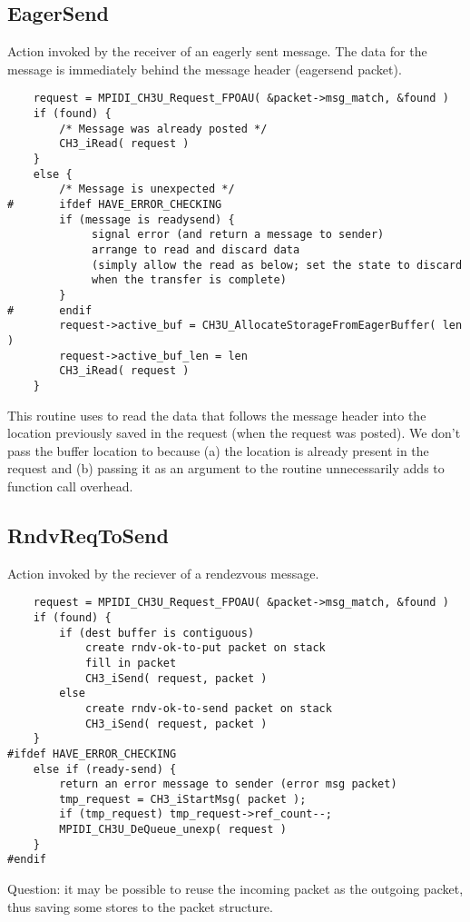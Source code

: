 \documentclass{article}
\begin{document}
\subsection{EagerSend}
Action invoked by the receiver of an eagerly sent message.  The data for the
message is immediately behind the message header (eagersend packet).
\begin{verbatim}
    request = MPIDI_CH3U_Request_FPOAU( &packet->msg_match, &found )
    if (found) {
        /* Message was already posted */
        CH3_iRead( request )
    }
    else {
        /* Message is unexpected */
#       ifdef HAVE_ERROR_CHECKING
        if (message is readysend) {
             signal error (and return a message to sender)
             arrange to read and discard data 
             (simply allow the read as below; set the state to discard
             when the transfer is complete)
        }
#       endif
        request->active_buf = CH3U_AllocateStorageFromEagerBuffer( len )
        request->active_buf_len = len
        CH3_iRead( request )
    }
\end{verbatim}
This routine uses  to read the data that follows the
message header into the location previously saved in the request (when
the request was posted).  We don't pass the buffer location to
 because (a) the location is already present in the
request and (b) passing it as an argument to the routine unnecessarily
adds to function call overhead.
\subsection{RndvReqToSend}
Action invoked by the reciever of a rendezvous message.
\begin{verbatim}
    request = MPIDI_CH3U_Request_FPOAU( &packet->msg_match, &found )
    if (found) {
        if (dest buffer is contiguous)
            create rndv-ok-to-put packet on stack
            fill in packet
            CH3_iSend( request, packet )
        else
            create rndv-ok-to-send packet on stack
            CH3_iSend( request, packet )
    }
#ifdef HAVE_ERROR_CHECKING
    else if (ready-send) {
        return an error message to sender (error msg packet)
        tmp_request = CH3_iStartMsg( packet );
        if (tmp_request) tmp_request->ref_count--;
        MPIDI_CH3U_DeQueue_unexp( request )
    }
#endif
\end{verbatim}
Question: it may be possible to reuse the incoming packet as the
outgoing packet, thus saving some stores to the packet structure.
\end{document}
